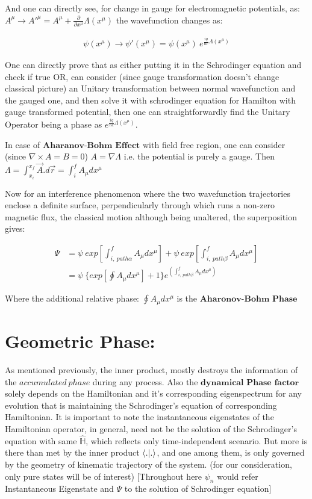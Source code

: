 \documentclass[8pt, twocoloumn]{article}
\begin{document}
And one can directly see, for change in gauge for electromagnetic potentials, as: $A^{\mu} \to A'^{\mu} = A^{\mu} + \frac{\partial}{\partial x^{\mu}}\Lambda(x^{\mu})$ the wavefunction changes as: 

\begin{align}
    \psi(x^{\mu}) \to \psi'(x^{\mu})= \psi(x^{\mu}) \ e^{\frac{iq}{\hbar c} \Lambda(x^{\mu})}
\end{align}

One can directly prove that as either putting it in the Schrodinger equation and check if true OR, can consider (since gauge transformation doesn't change classical picture) an Unitary transformation between normal wavefunction and the gauged one, and then solve it with schrodinger equation for Hamilton with gauge transformed potential, then one can straightforwardly find the Unitary Operator being a phase as $e^{\frac{iq}{\hbar c} \Lambda(x^{\mu})}$.

In case of $\textbf{Aharanov-Bohm Effect}$ with field free region, one can consider (since $\nabla \times A = B = 0$) $A = \nabla \Lambda$ i.e. the potential is purely a gauge. Then $\Lambda = \int^{x_f}_{x_i} \vec{A}.d\vec{r} = \int^{f}_{i} A_{\mu}dx^{\mu}$

Now for an interference phenomenon where the two wavefunction trajectories enclose a definite surface, perpendicularly through which runs a non-zero magnetic flux, the classical motion although being unaltered, the superposition gives:

\begin{align}
    \Psi &= \psi \ exp \left[ \int^{f}_{i, \ path \alpha} A_{\mu}dx^{\mu} \right]+  \psi \ exp \left[\int^{f}_{i, \ path \beta} A_{\mu}dx^{\mu} \right]\\
    &= \psi\  \Bigg\{ exp \left[ \oint  A_{\mu}dx^{\mu}\right]  + 1\Bigg\} e^{(\int^{f}_{i, \ path \beta} A_{\mu}dx^{\mu})}
\end{align}

Where the additional relative phase: $\oint  A_{\mu}dx^{\mu}$ is the $\textbf{Aharonov-Bohm Phase}$
\section{Geometric Phase:}

As mentioned previously, the inner product, mostly destroys the information of the $accumulated \ phase$ during any process. Also the $\textbf{dynamical Phase factor}$ solely depends on the Hamiltonian and it's corresponding eigenspectrum for any evolution that is maintaining the Schrodinger's equation of corresponding Hamiltonian. It is important to note the instantaneous eigenstates of the Hamiltonian operator, in general, need not be the solution of the Schrodinger's equation with same $\mathbb{\hat{H}}$, which reflects only time-independent scenario. But more is there than met by the inner product $\braket{.|.}$, and one among them, is only governed by the geometry of kinematic trajectory of the system.
(for our consideration, only pure states will be of interest)
[Throughout here $\psi_n$ would refer Instantaneous Eigenstate and $\Psi$ to the solution of Schrodinger equation]
\end{document}
